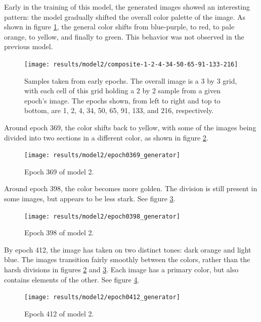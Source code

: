 \documentclass[11pt,letterpaper]{article}
\begin{document}
				Early in the training of this model, the generated images showed an interesting pattern: the model gradually shifted the overall color palette of the image.
				As shown in figure \ref{fig:cgvg:composite-1-2-4-34-50-65-91-133-216}, the general color shifts from blue-purple, to red, to pale orange, to yellow, and finally to green.
				This behavior was not observed in the previous model.
				\begin{figure}
					\centering
					\texttt{[image: results/model2/composite-1-2-4-34-50-65-91-133-216]}
					\caption[Samples of images from early epochs]{Samples taken from early epochs. The overall image is a 3 by 3 grid, with each cell of this grid holding a 2 by 2 sample from a given epoch's image. The epochs shown, from left to right and top to bottom, are 1, 2, 4, 34, 50, 65, 91, 133, and 216, respectively.}
					\label{fig:cgvg:composite-1-2-4-34-50-65-91-133-216}
				\end{figure}

				Around epoch 369, the color shifts back to yellow, with some of the images being divided into two sections in a different color, as shown in figure \ref{fig:cgvg:epoch0369generator}.
				\begin{figure}
					\centering
					\texttt{[image: results/model2/epoch0369\_generator]}
					\caption{Epoch 369 of model 2.}
					\label{fig:cgvg:epoch0369generator}
				\end{figure}

				Around epoch 398, the color becomes more golden.
				The division is still present in some images, but appears to be less stark.
				See figure \ref{fig:cgvg:epoch0398generator}.
				\begin{figure}
					\centering
					\texttt{[image: results/model2/epoch0398\_generator]}
					\caption{Epoch 398 of model 2.}
					\label{fig:cgvg:epoch0398generator}
				\end{figure}

				By epoch 412, the image has taken on two distinct tones: dark orange and light blue.
				The images transition fairly smoothly between the colors, rather than the harsh divisions in figures \ref{fig:cgvg:epoch0369generator} and \ref{fig:cgvg:epoch0398generator}.
				Each image has a primary color, but also contains elements of the other.
				See figure \ref{fig:cgvg:epoch0412generator}.
				\begin{figure}
					\centering
					\texttt{[image: results/model2/epoch0412\_generator]}
					\caption{Epoch 412 of model 2.}
					\label{fig:cgvg:epoch0412generator}
				\end{figure}
\end{document}
